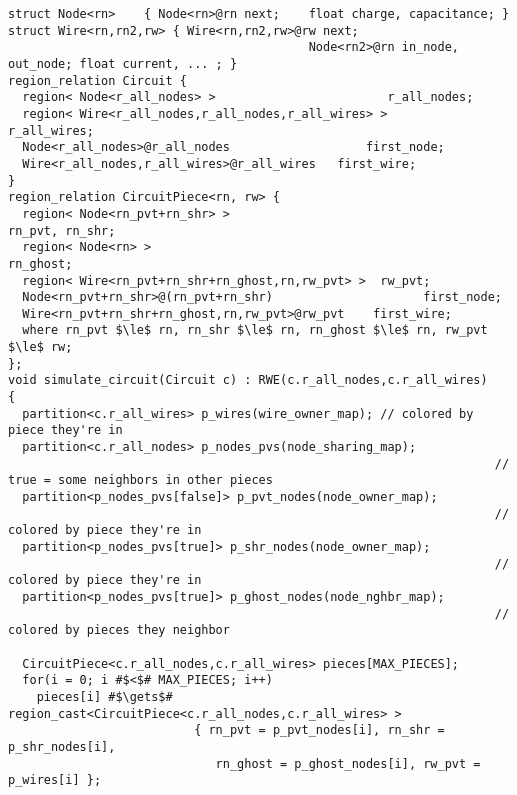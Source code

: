 \begin{lstlisting}[float={t},label={lst:code_ex},caption={Circuit Simulation Code Example}]
struct Node<rn>    { Node<rn>@rn next;    float charge, capacitance; }
struct Wire<rn,rn2,rw> { Wire<rn,rn2,rw>@rw next;
                                          Node<rn2>@rn in_node, out_node; float current, ... ; }
region_relation Circuit {
  region< Node<r_all_nodes> >                        r_all_nodes;
  region< Wire<r_all_nodes,r_all_nodes,r_all_wires> >       r_all_wires;
  Node<r_all_nodes>@r_all_nodes                   first_node;
  Wire<r_all_nodes,r_all_wires>@r_all_wires   first_wire;
}
region_relation CircuitPiece<rn, rw> {
  region< Node<rn_pvt+rn_shr> >                                 rn_pvt, rn_shr;
  region< Node<rn> >                                                   rn_ghost;
  region< Wire<rn_pvt+rn_shr+rn_ghost,rn,rw_pvt> >  rw_pvt;
  Node<rn_pvt+rn_shr>@(rn_pvt+rn_shr)                     first_node;
  Wire<rn_pvt+rn_shr+rn_ghost,rn,rw_pvt>@rw_pvt    first_wire;
  where rn_pvt $\le$ rn, rn_shr $\le$ rn, rn_ghost $\le$ rn, rw_pvt $\le$ rw;
};
void simulate_circuit(Circuit c) : RWE(c.r_all_nodes,c.r_all_wires)
{
  partition<c.r_all_wires> p_wires(wire_owner_map); // colored by piece they're in
  partition<c.r_all_nodes> p_nodes_pvs(node_sharing_map);
                                                                    // true = some neighbors in other pieces
  partition<p_nodes_pvs[false]> p_pvt_nodes(node_owner_map);
                                                                    // colored by piece they're in
  partition<p_nodes_pvs[true]> p_shr_nodes(node_owner_map);
                                                                    // colored by piece they're in
  partition<p_nodes_pvs[true]> p_ghost_nodes(node_nghbr_map);
                                                                    // colored by pieces they neighbor

  CircuitPiece<c.r_all_nodes,c.r_all_wires> pieces[MAX_PIECES];
  for(i = 0; i #$<$# MAX_PIECES; i++) 
    pieces[i] #$\gets$# region_cast<CircuitPiece<c.r_all_nodes,c.r_all_wires> >
                          { rn_pvt = p_pvt_nodes[i], rn_shr = p_shr_nodes[i],
                             rn_ghost = p_ghost_nodes[i], rw_pvt = p_wires[i] };


\end{lstlisting}
